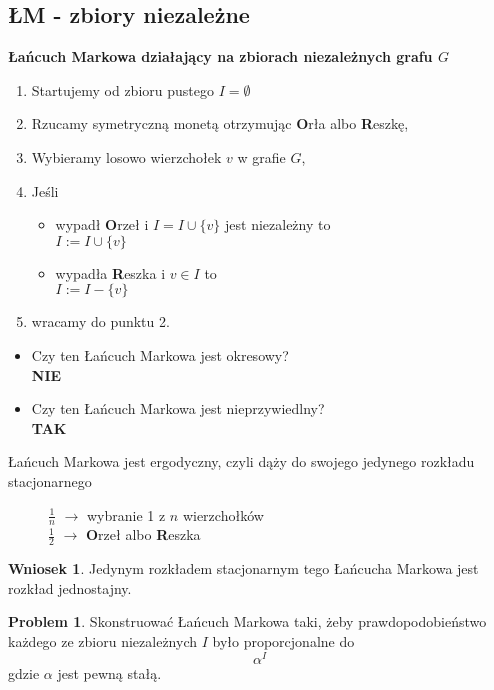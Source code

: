 \documentclass[a4paper,12pt]{article}
\theoremstyle{definition}%
\newtheorem{remark}{Wniosek}%
\theoremstyle{definition}
\theoremstyle{problem}
\newtheorem*{problem*}{Problem}
\begin{document}
\subsection{ŁM - zbiory niezależne}
\textbf{Łańcuch Markowa działający na zbiorach niezależnych grafu $G$}
\begin{enumerate}
\item Startujemy od zbioru pustego $I=\emptyset $
\item Rzucamy symetryczną monetą otrzymując \textbf{O}rła albo \textbf{R}eszkę,
\item Wybieramy losowo wierzchołek $v$ w grafie $G$,
\item Jeśli 
\begin{itemize}
\item[] wypadł \textbf{O}rzeł i $I=I\cup \{v\}$ jest niezależny to\\
$I:=I\cup \{v\}$
\item[] wypadła \textbf{R}eszka i $v\in I$ to\\
$I:=I- \{v\}$
\end{itemize}
\item wracamy do punktu 2.
\end{enumerate}
\begin{itemize}
\item Czy ten Łańcuch Markowa jest okresowy?\\\textbf{NIE}
\item Czy ten Łańcuch Markowa jest nieprzywiedlny?\\\textbf{TAK}
\end{itemize}
Łańcuch Markowa jest ergodyczny, czyli dąży do swojego jedynego rozkładu stacjonarnego

\begin{figure}[H]
\centering
{}
\caption*{$\frac{1}{n}$ $\rightarrow$ wybranie 1 z $n$ wierzchołków\\$\frac{1}{2}$ $\rightarrow$ \textbf{O}rzeł albo \textbf{R}eszka}
\end{figure}
\begin{remark}
Jedynym rozkładem stacjonarnym tego Łańcucha Markowa jest rozkład jednostajny.
\end{remark}
\begin{problem*}
Skonstruować Łańcuch Markowa taki, żeby prawdopodobieństwo każdego ze zbioru niezależnych $I$ było proporcjonalne do $$\alpha ^I$$ gdzie $\alpha $ jest pewną stałą.
\end{problem*}
\end{document}
